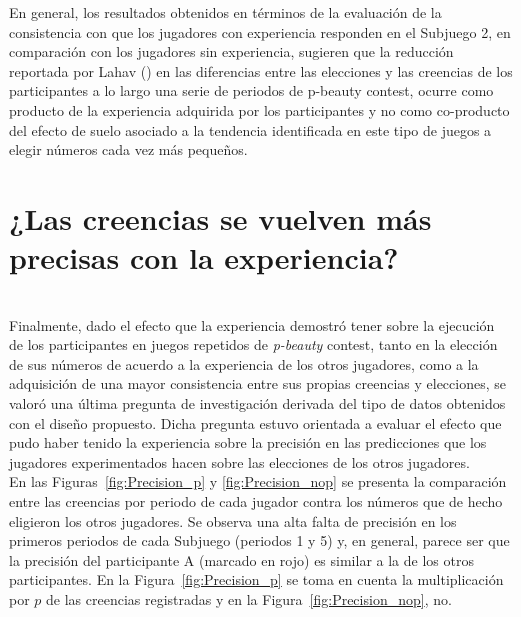 En general, los resultados obtenidos en términos de la evaluación de la consistencia con que los jugadores con experiencia responden en el Subjuego 2, en comparación con los jugadores sin experiencia, sugieren que la reducción reportada por Lahav (\citeyear{Lahav}) en las diferencias entre las elecciones y las creencias de los participantes a lo largo una serie de periodos de p-beauty contest, ocurre como producto de la experiencia adquirida por los participantes y no como co-producto del efecto de suelo asociado a la tendencia identificada en este tipo de juegos a elegir números cada vez más pequeños.\\

\section{¿Las creencias se vuelven más precisas con la experiencia?}\\

Finalmente, dado el efecto que la experiencia demostró tener sobre la ejecución de los participantes en juegos repetidos de \textit{p-beauty} contest, tanto en la elección de sus números de acuerdo a la experiencia de los otros jugadores, como a la adquisición de una mayor consistencia entre sus propias creencias y elecciones, se valoró una última pregunta de investigación derivada del tipo de datos obtenidos con el diseño propuesto. Dicha pregunta estuvo orientada a evaluar el efecto que pudo haber tenido la experiencia sobre la precisión en las predicciones que los jugadores experimentados hacen sobre las elecciones de los otros jugadores.\\

En las Figuras~\ref{fig:Precision_p} y \ref{fig:Precision_nop} se presenta la comparación entre las creencias por periodo de cada jugador contra los números que de hecho eligieron los otros jugadores. Se observa una alta falta de precisión en los primeros periodos de cada Subjuego (periodos 1 y 5) y, en general, parece ser que la precisión del participante A (marcado en rojo) es similar a la de los otros participantes. En la Figura~\ref{fig:Precision_p} se toma en cuenta la multiplicación por $p$ de las creencias registradas y en la Figura~\ref{fig:Precision_nop}, no.\\
   
